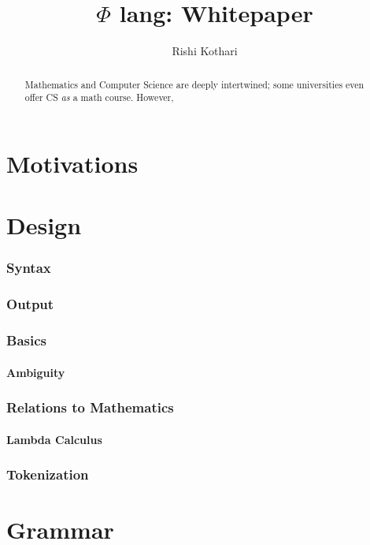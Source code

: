 \documentclass[]{report}
\title{$\Phi$ lang: Whitepaper}
\author{Rishi Kothari}
\date{}
\begin{document}
\maketitle

\newpage

\tableofcontents
\newpage
{}
\begin{abstract}
	Mathematics and Computer Science are deeply intertwined; some universities even offer CS \textit{as} a math course. However, 
\end{abstract}

\chapter{Motivations}


\chapter{Design}

\subsection{Syntax}


\subsection{Output}


\subsection{Basics}


\subsubsection{Ambiguity}


\subsection{Relations to Mathematics}

\subsubsection{Lambda Calculus}

\subsection{Tokenization}

\chapter{Grammar}

\subsection{}
\end{document}
